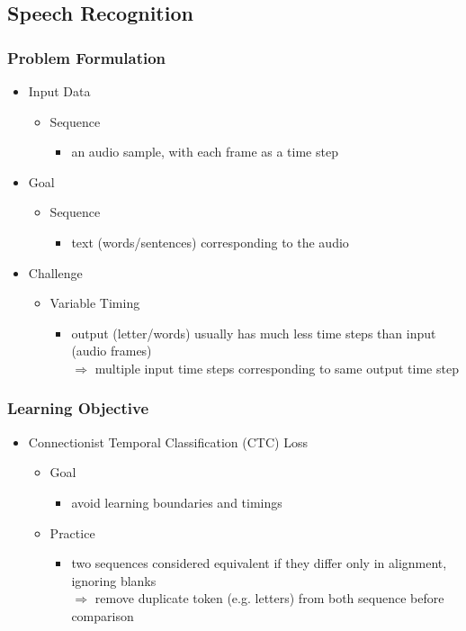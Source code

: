 \subsection{Speech Recognition}
\subsubsection{Problem Formulation}
\begin{itemize}
\item Input Data
	\begin{itemize}
	\item Sequence
		\begin{itemize}
		\item an audio sample, with each frame as a time step
		\end{itemize}
	\end{itemize}
\item Goal
	\begin{itemize}
	\item Sequence
		\begin{itemize}
		\item text (words/sentences) corresponding to the audio
		\end{itemize}
	\end{itemize}
\item Challenge
	\begin{itemize}
	\item Variable Timing
		\begin{itemize}
		\item output (letter/words) usually has much less time steps than input (audio frames) \\
		$\Rightarrow$ multiple input time steps corresponding to same output time step
		\end{itemize}
	\end{itemize}
\end{itemize}

\subsubsection{Learning Objective}
\begin{itemize}
\item Connectionist Temporal Classification (CTC) Loss
	\begin{itemize}
	\item Goal
		\begin{itemize}
		\item avoid learning boundaries and timings
		\end{itemize}
	\item Practice
		\begin{itemize}
		\item two sequences considered equivalent if they differ only in alignment, ignoring blanks \\
		$\Rightarrow$ remove duplicate token (e.g. letters) from both sequence before comparison
		\end{itemize}
	\end{itemize}
\end{itemize}

